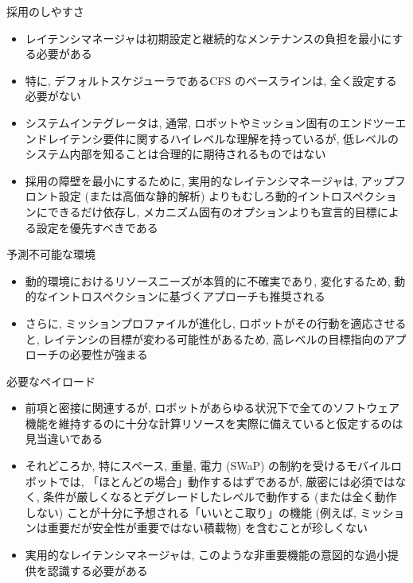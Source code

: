 \begin{frame}{採用のしやすさ}
    \begin{itemize}
        \item レイテンシマネージャは初期設定と継続的なメンテナンスの負担を最小にする必要がある
        \item 特に, デフォルトスケジューラであるCFS のベースラインは, 全く設定する必要がない
        \item システムインテグレータは, 通常, ロボットやミッション固有のエンドツーエンドレイテンシ要件に関するハイレベルな理解を持っているが, 低レベルのシステム内部を知ることは合理的に期待されるものではない
        \item 採用の障壁を最小にするために, 実用的なレイテンシマネージャは, アップフロント設定 (または高価な静的解析) よりもむしろ動的イントロスペクションにできるだけ依存し, メカニズム固有のオプションよりも宣言的目標による設定を優先すべきである
    \end{itemize}
\end{frame}

\begin{frame}{予測不可能な環境}
    \begin{itemize}
        \item 動的環境におけるリソースニーズが本質的に不確実であり, 変化するため, 動的なイントロスペクションに基づくアプローチも推奨される
        \item さらに, ミッションプロファイルが進化し, ロボットがその行動を適応させると, レイテンシの目標が変わる可能性があるため, 高レベルの目標指向のアプローチの必要性が強まる
    \end{itemize}
\end{frame}

\begin{frame}{必要なペイロード}
    \begin{itemize}
        \item 前項と密接に関連するが, ロボットがあらゆる状況下で全てのソフトウェア機能を維持するのに十分な計算リソースを実際に備えていると仮定するのは見当違いである
        \item それどころか, 特にスペース, 重量, 電力 (SWaP) の制約を受けるモバイルロボットでは, 「ほとんどの場合」動作するはずであるが, 厳密には必須ではなく, 条件が厳しくなるとデグレードしたレベルで動作する (または全く動作しない) ことが十分に予想される「いいとこ取り」の機能 (例えば, ミッションは重要だが安全性が重要ではない積載物) を含むことが珍しくない
        \item 実用的なレイテンシマネージャは, このような非重要機能の意図的な過小提供を認識する必要がある
    \end{itemize}
\end{frame}

